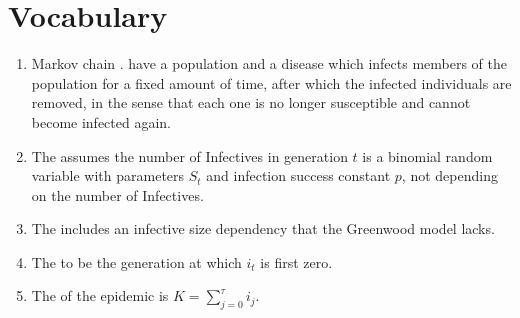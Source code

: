 \documentclass[12pt]{article}
\begin{document}
\section*{Vocabulary}
\begin{enumerate}
    \item
        Markov chain .
        have a population and a disease which infects members of the
        population for a fixed amount of time, after which the infected
        individuals are removed, in the sense that each one is no longer
        susceptible and cannot become infected again.
    \item
        The  assumes the number of Infectives in
        generation \( t \) is a binomial random variable with parameters
        \( S_t \) and infection success constant \( p \), not depending
        on the number of Infectives.
    \item
        The  includes an infective size
        dependency that the Greenwood model lacks.
    \item
        The  to be the
        generation at which \( i_t \) is first zero.
    \item
        The  of the epidemic is \( K=\sum_{j = 0}^{\tau}
        i_j \).
\end{enumerate}

\hr
\end{document}
